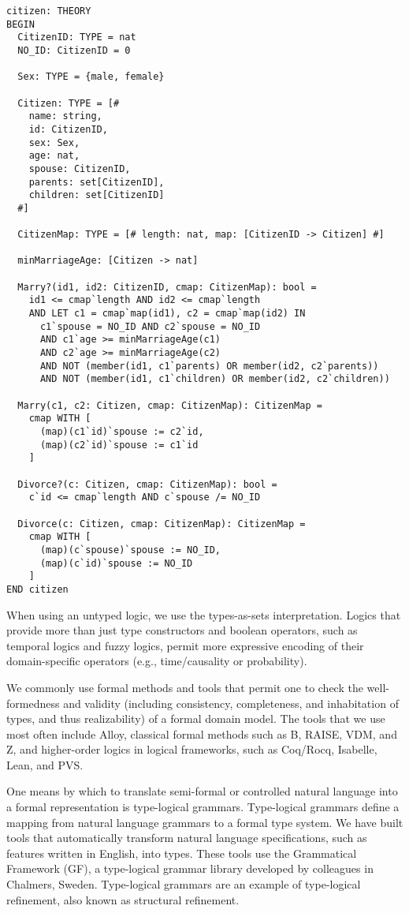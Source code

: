 \documentclass[10pt,letterpaper]{article}
\begin{document}
\begin{lstlisting}
citizen: THEORY
BEGIN
  CitizenID: TYPE = nat
  NO_ID: CitizenID = 0
  
  Sex: TYPE = {male, female}

  Citizen: TYPE = [#
    name: string,
    id: CitizenID,
    sex: Sex,
    age: nat,
    spouse: CitizenID,
    parents: set[CitizenID],
    children: set[CitizenID]
  #]

  CitizenMap: TYPE = [# length: nat, map: [CitizenID -> Citizen] #]

  minMarriageAge: [Citizen -> nat]

  Marry?(id1, id2: CitizenID, cmap: CitizenMap): bool =
    id1 <= cmap`length AND id2 <= cmap`length
    AND LET c1 = cmap`map(id1), c2 = cmap`map(id2) IN
      c1`spouse = NO_ID AND c2`spouse = NO_ID
      AND c1`age >= minMarriageAge(c1)
      AND c2`age >= minMarriageAge(c2)
      AND NOT (member(id1, c1`parents) OR member(id2, c2`parents))
      AND NOT (member(id1, c1`children) OR member(id2, c2`children))

  Marry(c1, c2: Citizen, cmap: CitizenMap): CitizenMap =
    cmap WITH [
      (map)(c1`id)`spouse := c2`id,
      (map)(c2`id)`spouse := c1`id
    ]

  Divorce?(c: Citizen, cmap: CitizenMap): bool =
    c`id <= cmap`length AND c`spouse /= NO_ID

  Divorce(c: Citizen, cmap: CitizenMap): CitizenMap =
    cmap WITH [
      (map)(c`spouse)`spouse := NO_ID,
      (map)(c`id)`spouse := NO_ID
    ]
END citizen
\end{lstlisting}

When using an untyped logic, we use the types-as-sets interpretation. Logics that provide more than just type constructors and boolean operators, such as temporal logics and fuzzy logics, permit more expressive encoding of their domain-specific operators (e.g., time/causality or probability).

We commonly use formal methods and tools that permit one to check the well-formedness and validity (including consistency, completeness, and inhabitation of types, and thus realizability) of a formal domain model. The tools that we use most often include Alloy, classical formal methods such as B, RAISE, VDM, and Z, and higher-order logics in logical frameworks, such as Coq/Rocq, Isabelle, Lean, and PVS.

One means by which to translate semi-formal or controlled natural language into a formal representation is type-logical grammars. Type-logical grammars define a mapping from natural language grammars to a formal type system. We have built tools that automatically transform natural language specifications, such as features written in English, into types. These tools use the Grammatical Framework (GF), a type-logical grammar library developed by colleagues in Chalmers, Sweden. Type-logical grammars are an example of type-logical refinement, also known as structural refinement.
\end{document}
